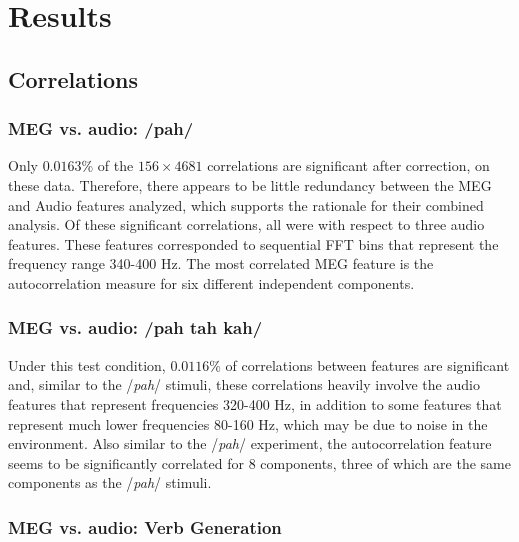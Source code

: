 \documentclass[utf8]{frontiersSCNS} %
\begin{document}
\section{Results}

\subsection{Correlations}

\subsubsection{MEG vs. audio: /pah/}

Only $0.0163$\% of the $156 \times 4681$ correlations are significant after correction, on these data. Therefore, there appears to be little redundancy between the MEG and Audio features analyzed, which supports the rationale for their combined analysis. Of these significant correlations, all were with respect to three audio features. These features corresponded to sequential FFT bins that represent the frequency range 340-400 Hz. The most correlated MEG feature is the autocorrelation measure for six different independent components.

\subsubsection{MEG vs. audio: /pah tah kah/}

Under this test condition, $0.0116$\% of correlations between features are significant and, similar to the /{\em pah}/ stimuli, these correlations heavily involve the audio features that represent frequencies 320-400 Hz, in addition to some features that represent much lower frequencies 80-160 Hz, which may be due to noise in the environment. Also similar to the /{\em pah}/ experiment, the autocorrelation feature seems to be significantly correlated for 8 components, three of which are the same components as the /{\em pah}/ stimuli.


\subsubsection{MEG vs. audio: Verb Generation}
\end{document}
